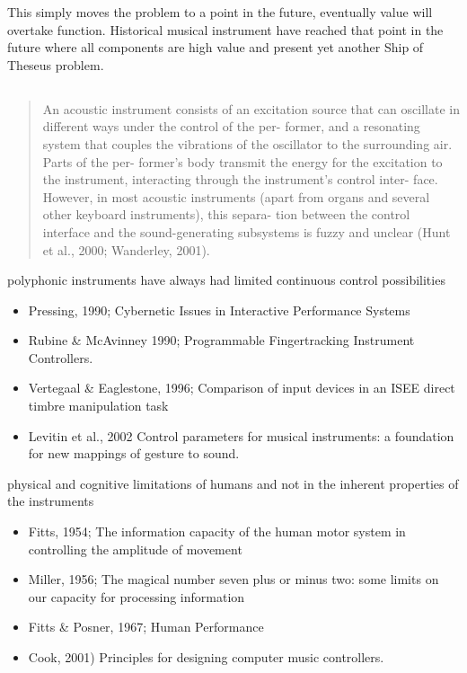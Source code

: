 This simply moves the problem to a point in the future, eventually value will
overtake function. Historical musical instrument have reached that point in the
future where all components are high value and present yet another Ship of
Theseus problem.

\subsection{\cite{jorda_instruments_2004}}


\begin{quotation}
An acoustic instrument consists of an excitation source that can oscillate in
different ways under the control of the per- former, and a resonating system
that couples the vibrations of the oscillator to the surrounding air. Parts of
the per- former’s body transmit the energy for the excitation to the instrument,
interacting through the instrument’s control inter- face. However, in most
acoustic instruments (apart from organs and several other keyboard instruments),
this separa- tion between the control interface and the sound-generating
subsystems is fuzzy and unclear (Hunt et al., 2000; Wanderley, 2001).
\end{quotation}

polyphonic instruments have always had limited continuous control possibilities
\begin{itemize}
    \item Pressing, 1990; Cybernetic Issues in Interactive Performance Systems
    \item Rubine \& McAvinney 1990; Programmable Fingertracking Instrument
    Controllers.
    \item Vertegaal \& Eaglestone, 1996; Comparison of input devices in an ISEE
    direct timbre manipulation task
    \item Levitin et al., 2002 Control parameters for musical instruments: a
    foundation for new mappings of gesture to sound.
\end{itemize}

physical and cognitive limitations of humans and not in the inherent properties
of the instruments
\begin{itemize}
    \item Fitts, 1954;  The information capacity of the human motor system in
    controlling the amplitude of movement
    \item Miller, 1956; The magical number seven plus or minus two: some limits
    on our capacity for processing information
    \item Fitts \& Posner, 1967; Human Performance
    \item Cook, 2001) Principles for designing computer music controllers.
\end{itemize}


